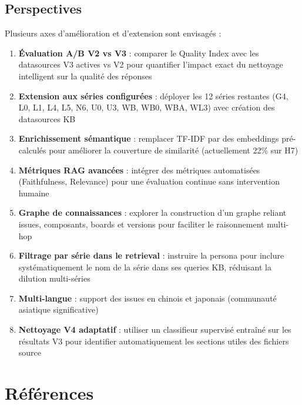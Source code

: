 \documentclass[12pt,a4paper]{report}
\begin{document}
\section{Perspectives}

Plusieurs axes d'amélioration et d'extension sont envisagés :

\begin{enumerate}
  \item \textbf{Évaluation A/B V2 vs V3} : comparer le Quality Index avec les datasources V3 actives vs V2 pour quantifier l'impact exact du nettoyage intelligent sur la qualité des réponses
  \item \textbf{Extension aux séries configurées} : déployer les 12 séries restantes (G4, L0, L1, L4, L5, N6, U0, U3, WB, WB0, WBA, WL3) avec création des datasources KB
  \item \textbf{Enrichissement sémantique} : remplacer TF-IDF par des embeddings pré-calculés pour améliorer la couverture de similarité (actuellement 22\% sur H7)
  \item \textbf{Métriques RAG avancées} : intégrer des métriques automatisées (Faithfulness, Relevance) pour une évaluation continue sans intervention humaine
  \item \textbf{Graphe de connaissances} : explorer la construction d'un graphe reliant issues, composants, boards et versions pour faciliter le raisonnement multi-hop
  \item \textbf{Filtrage par série dans le retrieval} : instruire la persona pour inclure systématiquement le nom de la série dans ses queries KB, réduisant la dilution multi-séries
  \item \textbf{Multi-langue} : support des issues en chinois et japonais (communauté asiatique significative)
  \item \textbf{Nettoyage V4 adaptatif} : utiliser un classifieur supervisé entraîné sur les résultats V3 pour identifier automatiquement les sections utiles des fichiers source
\end{enumerate}

\chapter*{Références}
\end{document}
